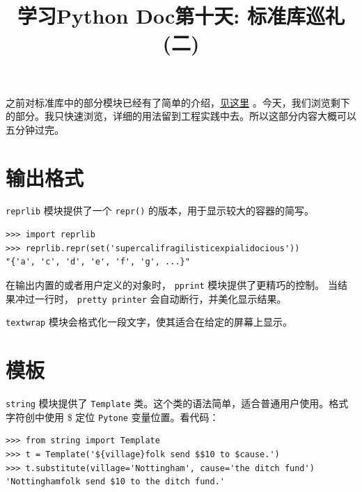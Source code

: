 \documentclass[10pt,a4paper,UTF8]{article}
\date{}
\title{学习Python Doc第十天: 标准库巡礼(二)}
\begin{document}
\maketitle
\tableofcontents
{}
之前对标准库中的部分模块已经有了简单的介绍，\href{learning-python-day09.org}{见这里} 。今天，我们浏览剩下的部分。我只快速浏览，详细的用法留到工程实践中去。所以这部分内容大概可以五分钟过完。

\section{输出格式}
\label{sec:org1c963f1}


\texttt{reprlib} 模块提供了一个 \texttt{repr()} 的版本，用于显示较大的容器的简写。

\begin{verbatim}
>>> import reprlib
>>> reprlib.repr(set('supercalifragilisticexpialidocious'))
"{'a', 'c', 'd', 'e', 'f', 'g', ...}"
\end{verbatim}

在输出内置的或者用户定义的对象时， \texttt{pprint} 模块提供了更精巧的控制。 当结果冲过一行时， \texttt{pretty printer} 会自动断行，并美化显示结果。

\texttt{textwrap} 模块会格式化一段文字，使其适合在给定的屏幕上显示。
\section{模板}
\label{sec:org6fc2d75}


\texttt{string} 模块提供了 \texttt{Template} 类。这个类的语法简单，适合普通用户使用。格式字符创中使用 \$ 定位 \texttt{Pytone} 变量位置。看代码：
\begin{verbatim}
>>> from string import Template
>>> t = Template('${village}folk send $$10 to $cause.')
>>> t.substitute(village='Nottingham', cause='the ditch fund')
'Nottinghamfolk send $10 to the ditch fund.'
\end{verbatim}
\end{document}
